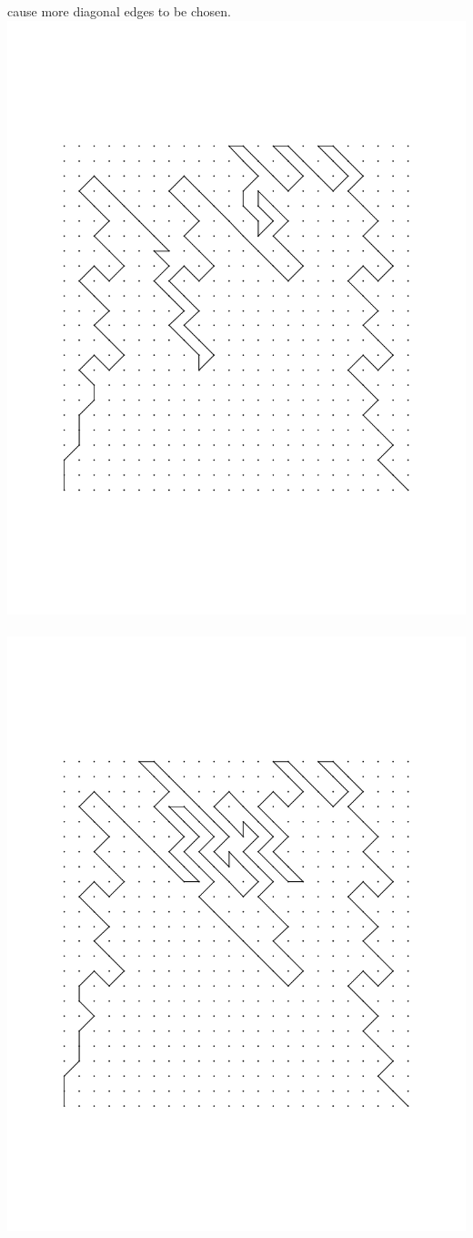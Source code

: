 \documentclass[letterpaper,11pt]{texMemo} %
\begin{document}
\begin{center}
cause more diagonal edges to be chosen.\\
\includegraphics[scale=0.25]{24X20S50D30TO30TI.pdf} \  \includegraphics[scale=0.25]{24X20S50D30TO40TI.pdf} \\

\end{center}
\end{document}
